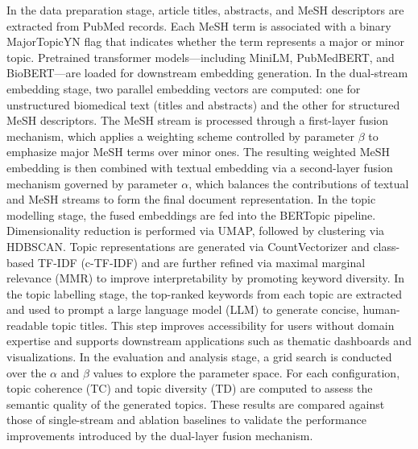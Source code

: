 \documentclass[utf8]{FrontiersinHarvard}
\begin{document}
In the data preparation stage, article titles, abstracts, and MeSH descriptors are extracted from PubMed records. Each MeSH term is associated with a binary MajorTopicYN flag that indicates whether the term represents a major or minor topic. Pretrained transformer models—including MiniLM, PubMedBERT, and BioBERT—are loaded for downstream embedding generation.
In the dual-stream embedding stage, two parallel embedding vectors are computed: one for unstructured biomedical text (titles and abstracts) and the other for structured MeSH descriptors. The MeSH stream is processed through a first-layer fusion mechanism, which applies a weighting scheme controlled by parameter $\beta$ to emphasize major MeSH terms over minor ones. The resulting weighted MeSH embedding is then combined with textual embedding via a second-layer fusion mechanism governed by parameter $\alpha$, which balances the contributions of textual and MeSH streams to form the final document representation.
In the topic modelling stage, the fused embeddings are fed into the BERTopic pipeline. Dimensionality reduction is performed via UMAP, followed by clustering via HDBSCAN. Topic representations are generated via CountVectorizer and class-based TF-IDF (c-TF-IDF) and are further refined via maximal marginal relevance (MMR) to improve interpretability by promoting keyword diversity.
In the topic labelling stage, the top-ranked keywords from each topic are extracted and used to prompt a large language model (LLM) to generate concise, human-readable topic titles. This step improves accessibility for users without domain expertise and supports downstream applications such as thematic dashboards and visualizations.
In the evaluation and analysis stage, a grid search is conducted over the $\alpha$ and $\beta$ values to explore the parameter space. For each configuration, topic coherence (TC) and topic diversity (TD) are computed to assess the semantic quality of the generated topics. These results are compared against those of single-stream and ablation baselines to validate the performance improvements introduced by the dual-layer fusion mechanism.
\end{document}
